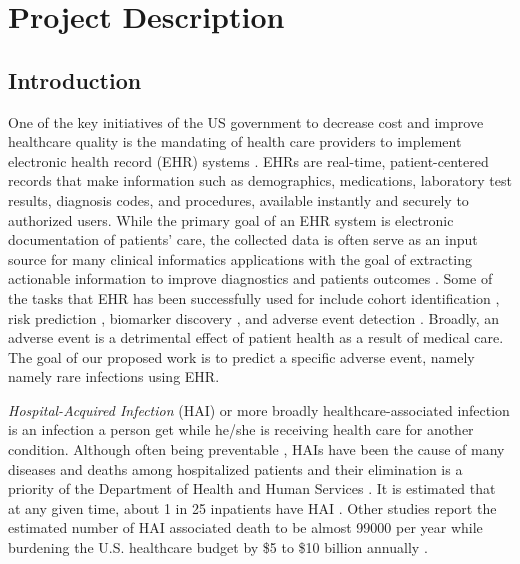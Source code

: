 \section{Project Description}
\subsection{Introduction}
One of the key initiatives of the US government to decrease cost and improve healthcare quality is the mandating of health care providers to implement electronic health record (EHR) systems \cite{ehr}. EHRs are real-time, patient-centered records that make information such as demographics, medications, laboratory test results, diagnosis codes, and procedures, available instantly and securely to authorized users. While the primary goal of an EHR system is electronic documentation of patients’ care, the collected data is often serve as an input source for many clinical informatics applications with the goal of extracting actionable information to improve diagnostics and patients outcomes \cite{yadav2018mining, rajkomar2018scalable, shickel2018deep}. Some of the tasks that EHR has been successfully used for include cohort identification \cite{kirby2016phekb, shivade2013review}, risk prediction \cite{ng2014paramo, wiens2012patient}, biomarker discovery \cite{bitton2010framingham}, and adverse event detection \cite{levinson2010adverse, torio2006trends}. Broadly, an adverse event is a detrimental effect of patient health as a result of medical care. The goal of our proposed work is to predict a specific adverse event, namely namely rare infections using EHR. 


\emph{Hospital-Acquired Infection} (HAI) or more broadly healthcare-associated infection is an infection a person get while he/she is receiving health care for another condition. Although often being preventable \cite{progress, yokoe2014compendium, umscheid2011estimating}, HAIs have been the cause of many diseases and deaths among hospitalized patients \cite{miller2011comparison, cdc, scott2009direct, klevens2007estimating} and their elimination is a priority of the Department of Health and Human Services \cite{hhs}. It is estimated that at any given time, about 1 in 25 inpatients have HAI \cite{magill2014multistate, hhs}. Other studies report the estimated number of HAI associated death to be almost 99000 per year \cite{klevens2007estimating} while burdening the U.S. healthcare budget by \$5 to \$10 billion annually \cite{stone2005economic, zimlichman2013health}. 



